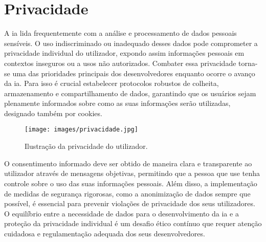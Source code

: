 \documentclass[a4paper, 11pt, onecolumn, oneside]{report}
\begin{document}
\section{Privacidade}
A \ac{ia} lida frequentemente com a análise e processamento de dados pessoais sensíveis. O uso indiscriminado ou inadequado desses dados pode comprometer a privacidade individual do utilizador, expondo assim informações pessoais em contextos inseguros ou a usos não autorizados. Combater essa privacidade torna-se uma das prioridades principais dos desenvolvedores enquanto ocorre o avanço da \ac{ia}. Para isso é crucial estabelecer protocolos robustos de colheita, armazenamento e compartilhamento de dados, garantindo que os usuários sejam plenamente informados sobre como as suas informações serão utilizadas, designado também por cookies\cite{privacidade}.
\par
\begin{figure}[ht]
    \centering
    \texttt{[image: images/privacidade.jpg]}
    \caption{Ilustração da privacidade do utilizador.\cite{i42}}
    \label{privacidade}
\end{figure}
O consentimento informado deve ser obtido de maneira clara e transparente ao utilizador através de mensagens objetivas, permitindo que a pessoa que use tenha controle sobre o uso das suas informações pessoais. Além disso, a implementação de medidas de segurança rigorosas, como a anonimização de dados sempre que possível, é essencial para prevenir violações de privacidade dos seus utilizadores. O equilíbrio entre a necessidade de dados para o desenvolvimento da \ac{ia} e a proteção da privacidade individual é um desafio ético contínuo que requer atenção cuidadosa e regulamentação adequada dos seus desenvolvedores.  
%
\end{document}
